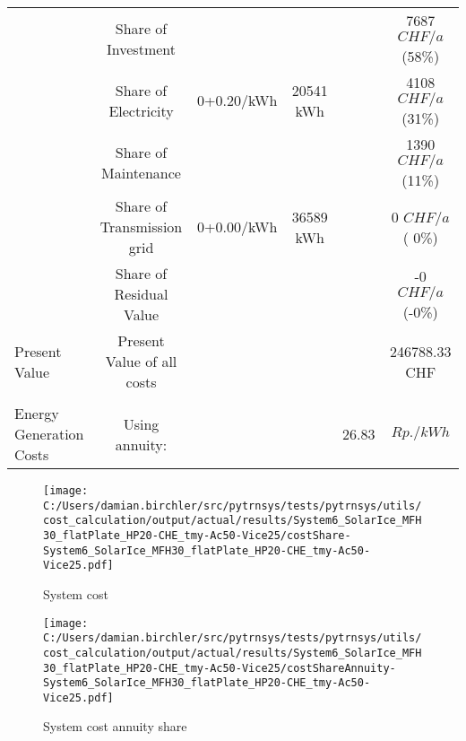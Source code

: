 \documentclass[english]{SPFShortReport}
\begin{document}
\begin{table}[!ht]
\begin{adjustbox}{max width =\textwidth}
\begin{tabular}{l | c c c c c }
 & Share of Investment & &&& 7687 $CHF/a$ (58\%) \\ 
 & Share of Electricity  & 0+0.20/kWh & 20541 kWh&  & 4108 $CHF/a$ (31\%)\\ 
 & Share of Maintenance & &&& 1390 $CHF/a$ (11\%)\\ 
 & Share of Transmission grid & 0+0.00/kWh & 36589  kWh & &  0 $CHF/a$ ( 0\%)\\ 
 & Share of Residual Value &&& & -0 $CHF/a$ (-0\%)\\ 
Present Value  & Present Value of all costs  & &&& 246788.33 CHF  \\ 
\hline \\ 
 Energy Generation Costs & Using annuity: &&& 26.83 & $Rp./kWh$ \\ 
\hline
\hline
\end{tabular}
\end{adjustbox}
\label{CostsTable}
\end{table}
\begin{figure}[!htbp]
\begin{center}
\texttt{[image: C:/Users/damian.birchler/src/pytrnsys/tests/pytrnsys/utils/cost\_calculation/output/actual/results/System6\_SolarIce\_MFH30\_flatPlate\_HP20-CHE\_tmy-Ac50-Vice25/costShare-System6\_SolarIce\_MFH30\_flatPlate\_HP20-CHE\_tmy-Ac50-Vice25.pdf]}
\caption{System cost}
\label{systemCost}
\end{center}
\end{figure}
\begin{figure}[!htbp]
\begin{center}
\texttt{[image: C:/Users/damian.birchler/src/pytrnsys/tests/pytrnsys/utils/cost\_calculation/output/actual/results/System6\_SolarIce\_MFH30\_flatPlate\_HP20-CHE\_tmy-Ac50-Vice25/costShareAnnuity-System6\_SolarIce\_MFH30\_flatPlate\_HP20-CHE\_tmy-Ac50-Vice25.pdf]}
\caption{System cost annuity share}
\label{systemCostannuity}
\end{center}
\end{figure}
\end{document}
